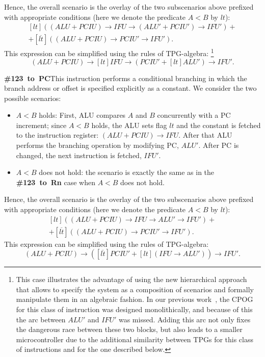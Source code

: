 Hence, the overall scenario is the overlay of the two subscenarios
above prefixed with appropriate conditions (here we denote the predicate
$A<B$ by $lt$): 
\[
\begin{array}{c}
[lt]((\mathit{ALU}+\mathit{PCIU})\!\rightarrow\!\mathit{IFU}\!\rightarrow\!(\mathit{ALU'}+\mathit{PCIU'})\!\rightarrow\!\mathit{IFU'})+\\
+[\overline{lt}]((\mathit{ALU}+\mathit{PCIU})\!\rightarrow\!\mathit{PCIU'}\!\rightarrow\!\mathit{IFU'}).
\end{array}
\]
This expression can be simplified using the rules of TPG-algebra:%
\footnote{This case illustrates the advantage of using the new hierarchical
approach that allows to specify the system as a composition of scenarios
and formally manipulate them in an algebraic fashion. In our previous work~\cite{cpog_encoding},
the CPOG for this class of instruction
was designed monolithically, and because of this the arc between $\mathit{ALU'}$
and $\mathit{IFU'}$ was missed. Adding this arc not only fixes the
dangerous race between these two blocks, but also leads to a smaller
microcontroller due to the additional similarity between TPGs for
this class of instructions and for the one described below.%
}
\[
(\mathit{ALU}+\mathit{PCIU})\!\rightarrow\![lt]\mathit{IFU}\!\rightarrow\!(\mathit{PCIU'}+[lt]\mathit{ALU'})\!\rightarrow\!\mathit{IFU'}.
\]


\textbf{\#123~to~PC}\quad{}This instruction performs a conditional
branching in which the branch address or offset is specified explicitly
as a constant. We consider the two possible scenarios:
\begin{itemize}
\item $A<B$ holds: First, ALU compares $A$ and $B$ concurrently with
a PC increment; since $A<B$ holds, the ALU sets flag $lt$ and the
constant is fetched to the instruction register: $(\mathit{ALU}+\mathit{PCIU})\rightarrow\mathit{IFU}$.
After that ALU performs the branching operation by modifying PC, $\mathit{ALU'}$.
After PC is changed, the next instruction is fetched, $\mathit{IFU'}$.
\item $A<B$ does not hold: the scenario is exactly the same as in the \textbf{\#123~to~Rn
}case when $A<B$ does not hold.
\end{itemize}
Hence, the overall scenario is the overlay of the two subscenarios
above prefixed with appropriate conditions (here we denote the predicate
$A<B$ by $lt$): 
\[
\begin{array}{c}
[lt]((\mathit{ALU}+\mathit{PCIU})\!\rightarrow\!\mathit{IFU}\!\rightarrow\!\mathit{ALU'}\!\rightarrow\!\mathit{IFU'})+\\
+[\overline{lt}]((\mathit{ALU}+\mathit{PCIU})\!\rightarrow\!\mathit{PCIU'}\!\rightarrow\!\mathit{IFU'}).
\end{array}
\]
This expression can be simplified using the rules of TPG-algebra:
\[
(\mathit{ALU}+\mathit{PCIU})\!\rightarrow\!([\overline{lt}]\mathit{PCIU'}+[lt](\mathit{IFU}\!\rightarrow\!\mathit{ALU'}))\!\rightarrow\!\mathit{IFU'}.
\]


